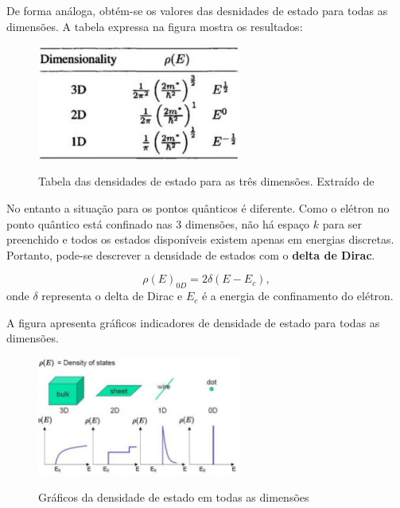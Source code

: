 	\par De forma análoga, obtém-se os valores das desnidades de estado para todas as dimensões. A tabela expressa na figura mostra os resultados:

	\begin{figure}[H]
	  \caption{Tabela das densidades de estado para as três dimensões. Extraído de \cite{confinamento3}}
	  \centering
	  \includegraphics[width=0.6\textwidth]{images/figura12.jpg}
	  \label{fig12}
	\end{figure}

	\par No entanto a situação para os pontos quânticos é diferente. Como o elétron no ponto quântico está confinado nas 3 dimensões, não há espaço $k$ para ser preenchido e todos os estados disponíveis existem apenas em energias discretas. Portanto, pode-se descrever a densidade de estados com o \textbf{delta de Dirac}. 

	\begin{equation}
		\label{confinamento_8}
		 \rho(E)_{0D} = 2\delta(E-E_{c}),
	\end{equation}
	onde $\delta$ representa o delta de Dirac e $E_{c}$ é a energia de confinamento do elétron.

	\par A figura  apresenta gráficos indicadores de densidade de estado para todas as dimensões.

	\begin{figure}[H]
	  \caption{Gráficos da densidade de estado em todas as dimensões}
	  \centering
	  \includegraphics[width=0.6\textwidth]{images/figura13.jpg}
	  \label{fig13}
	\end{figure}

